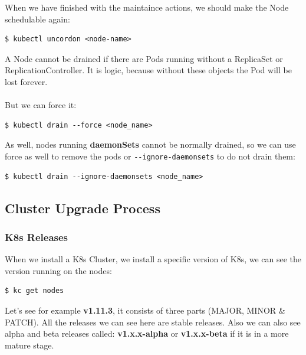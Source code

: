 \documentclass{article}
\newenvironment{blocktemplateIII}[1]{%
    \tcolorbox[beamer,%
    noparskip,breakable,
    ,colframe=Red,%
    colbacklower=LimeGreen!75!LightGreen,%
    title=#1]}%
    {\endtcolorbox}
\newenvironment{codetemplate}[1][]{%
  \mybasecolorbox[#1]
  \itshape
}{%
  \endmybasecolorbox
}
\begin{document}
When we have finished with the maintaince actions, we should make the Node schedulable again:
\begin{codetemplate}{}
\begin{verbatim}
$ kubectl uncordon <node-name>
\end{verbatim}
\end{codetemplate}

\begin{blocktemplateIII}{WARNING}
A Node cannot be drained if there are Pods running without a ReplicaSet or ReplicationController. It is logic, because without these objects the Pod will be lost forever.
\\\\
But we can force it:
\begin{codetemplate}{}
\begin{verbatim}
$ kubectl drain --force <node_name>
\end{verbatim}
\end{codetemplate}
As well, nodes running \textbf{daemonSets} cannot be normally drained, so we can use force as well to remove the pods or \verb|--ignore-daemonsets| to do not drain them:
\begin{codetemplate}{}
\begin{verbatim}
$ kubectl drain --ignore-daemonsets <node_name>
\end{verbatim}
\end{codetemplate}
\end{blocktemplateIII}

\subsection{Cluster Upgrade Process}

\subsubsection{K8s Releases}
When we install a K8s Cluster, we install a specific version of K8s, we can see the version running on the nodes:

\begin{codetemplate}{}
\begin{verbatim}
$ kc get nodes
\end{verbatim}
\end{codetemplate}

Let's see for example \textbf{v1.11.3}, it consists of three parts (MAJOR, MINOR \& PATCH). All the releases we can see here are stable releases. Also we can also see alpha and beta releases called: \textbf{v1.x.x-alpha} or \textbf{v1.x.x-beta} if it is in a more mature stage.
\end{document}
